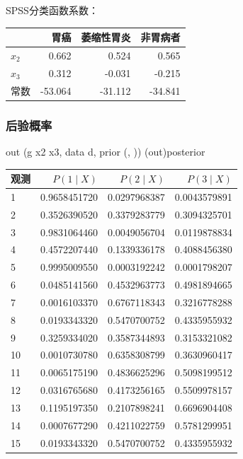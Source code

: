 SPSS分类函数系数：
\begin{center}\begin{tabular}{lrrr}\toprule
&{\bfseries 胃癌}&{\bfseries 萎缩性胃炎}&{\bfseries 非胃病者}\\\midrule
$x_2$&0.662&0.524&0.565\\$x_3$&0.312&-0.031&-0.215\\常数&-53.064&-31.112&-34.841\\\bottomrule
\end{tabular}\end{center}
\subsubsection{后验概率}
\begin{code}
out \ROperator{<-} (g \ROperator{~} x2 \ROperator{+} x3, data \ROperator{=} d, prior \ROperator{=} (\ROperator{/}, ))   
(out)\ROperator{\$}posterior
\end{code}
\par\addvspace{5pt}\begin{center}\begin{minipage}{\linewidth}\centering
\small
{}\label{tab:post3}
\begin{tabular}{lrrr}\toprule
{\bfseries 观测 }&{\bfseries  $P(1\mid X)$ }&{\bfseries  $P(2\mid X)$ }&{\bfseries  $P(3\mid X)$}\\\midrule
1 & 0.9658451720 & 0.0297968387 & 0.0043579891\\
2 & 0.3526390520 & 0.3379283779 & 0.3094325701\\
3 & 0.9831064460 & 0.0049056704 & 0.0119878834\\
4 & 0.4572207440 & 0.1339336178 & 0.4088456380\\
5 & 0.9995009550 & 0.0003192242 & 0.0001798207\\
6 & 0.0485141560 & 0.4532963773 & 0.4981894665\\
7 & 0.0016103370 & 0.6767118343 & 0.3216778288\\
8 & 0.0193343320 & 0.5470700752 & 0.4335955932\\
9 & 0.3259334020 & 0.3587344893 & 0.3153321082\\
10 & 0.0010730780 & 0.6358308799 & 0.3630960417\\
11 & 0.0065175190 & 0.4836625296 & 0.5098199512\\
12 & 0.0316765680 & 0.4173256165 & 0.5509978157\\
13 & 0.1195197350 & 0.2107898241 & 0.6696904408\\
14 & 0.0007677290 & 0.4211022759 & 0.5781299951\\
15 & 0.0193343320 & 0.5470700752 & 0.4335955932\\
\bottomrule\end{tabular}
\end{minipage}\end{center}

